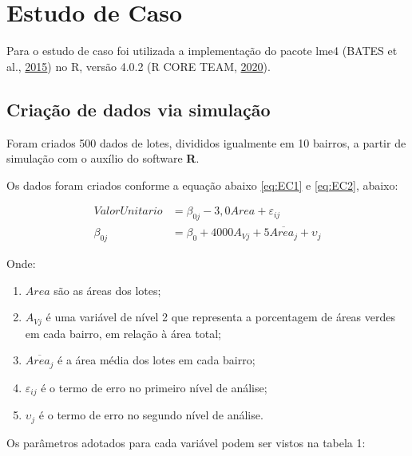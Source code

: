 \documentclass[
  a4paper, 11pt]{article}
\providecommand{\tightlist}{%
  \setlength{\itemsep}{0pt}\setlength{\parskip}{0pt}}
\newcommand{\pkg}[1]{{\normalfont\fontseries{b}\selectfont #1}}
\let\proglang=\textsf
\begin{document}
\hypertarget{estudo-de-caso}{%
\section{Estudo de Caso}\label{estudo-de-caso}}

Para o estudo de caso foi utilizada a implementação do pacote \pkg{lme4}
(BATES et al., \protect\hyperlink{ref-Bates}{2015}) no \proglang{R},
versão 4.0.2 (R CORE TEAM, \protect\hyperlink{ref-R}{2020}).

\hypertarget{criauxe7uxe3o-de-dados-via-simulauxe7uxe3o}{%
\subsection{Criação de dados via
simulação}\label{criauxe7uxe3o-de-dados-via-simulauxe7uxe3o}}

Foram criados 500 dados de lotes, divididos igualmente em 10 bairros, a
partir de simulação com o auxílio do software \textbf{R}.

Os dados foram criados conforme a equação abaixo \ref{eq:EC1} e
\ref{eq:EC2}, abaixo:

\begin{align}
ValorUnitario &= \beta_{0j} - 3,0 Area + \varepsilon_{ij}  \label{eq:EC1}\\
\beta_{0j} &= \beta_0 + 4000 A_{Vj} + 5 \overline{Area_j} + \upsilon_j \label{eq:EC2}
\end{align}

Onde:

\begin{enumerate}
\def\labelenumi{\arabic{enumi}.}
\tightlist
\item
  \(Area\) são as áreas dos lotes;
\item
  \(A_{Vj}\) é uma variável de nível 2 que representa a porcentagem de
  áreas verdes em cada bairro, em relação à área total;
\item
  \(\overline{Area_j}\) é a área média dos lotes em cada bairro;
\item
  \(\varepsilon_{ij}\) é o termo de erro no primeiro nível de análise;
\item
  \(\upsilon_j\) é o termo de erro no segundo nível de análise.
\end{enumerate}

Os parâmetros adotados para cada variável podem ser vistos na tabela 1:
\end{document}
